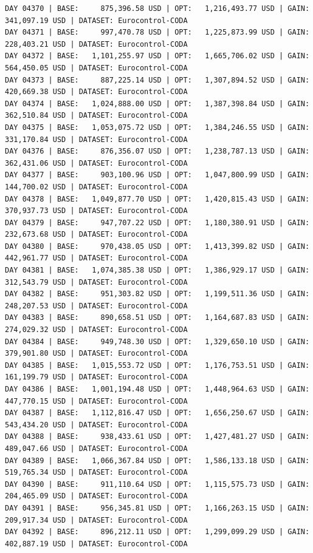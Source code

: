 \documentclass[11pt,a4paper]{article}
\begin{document}
\begin{verbatim}
DAY 04370 | BASE:     875,396.58 USD | OPT:   1,216,493.77 USD | GAIN: 341,097.19 USD | DATASET: Eurocontrol-CODA
DAY 04371 | BASE:     997,470.78 USD | OPT:   1,225,873.99 USD | GAIN: 228,403.21 USD | DATASET: Eurocontrol-CODA
DAY 04372 | BASE:   1,101,255.97 USD | OPT:   1,665,706.02 USD | GAIN: 564,450.05 USD | DATASET: Eurocontrol-CODA
DAY 04373 | BASE:     887,225.14 USD | OPT:   1,307,894.52 USD | GAIN: 420,669.38 USD | DATASET: Eurocontrol-CODA
DAY 04374 | BASE:   1,024,888.00 USD | OPT:   1,387,398.84 USD | GAIN: 362,510.84 USD | DATASET: Eurocontrol-CODA
DAY 04375 | BASE:   1,053,075.72 USD | OPT:   1,384,246.55 USD | GAIN: 331,170.84 USD | DATASET: Eurocontrol-CODA
DAY 04376 | BASE:     876,356.07 USD | OPT:   1,238,787.13 USD | GAIN: 362,431.06 USD | DATASET: Eurocontrol-CODA
DAY 04377 | BASE:     903,100.96 USD | OPT:   1,047,800.99 USD | GAIN: 144,700.02 USD | DATASET: Eurocontrol-CODA
DAY 04378 | BASE:   1,049,877.70 USD | OPT:   1,420,815.43 USD | GAIN: 370,937.73 USD | DATASET: Eurocontrol-CODA
DAY 04379 | BASE:     947,707.22 USD | OPT:   1,180,380.91 USD | GAIN: 232,673.68 USD | DATASET: Eurocontrol-CODA
DAY 04380 | BASE:     970,438.05 USD | OPT:   1,413,399.82 USD | GAIN: 442,961.77 USD | DATASET: Eurocontrol-CODA
DAY 04381 | BASE:   1,074,385.38 USD | OPT:   1,386,929.17 USD | GAIN: 312,543.79 USD | DATASET: Eurocontrol-CODA
DAY 04382 | BASE:     951,303.82 USD | OPT:   1,199,511.36 USD | GAIN: 248,207.53 USD | DATASET: Eurocontrol-CODA
DAY 04383 | BASE:     890,658.51 USD | OPT:   1,164,687.83 USD | GAIN: 274,029.32 USD | DATASET: Eurocontrol-CODA
DAY 04384 | BASE:     949,748.30 USD | OPT:   1,329,650.10 USD | GAIN: 379,901.80 USD | DATASET: Eurocontrol-CODA
DAY 04385 | BASE:   1,015,553.72 USD | OPT:   1,176,753.51 USD | GAIN: 161,199.79 USD | DATASET: Eurocontrol-CODA
DAY 04386 | BASE:   1,001,194.48 USD | OPT:   1,448,964.63 USD | GAIN: 447,770.15 USD | DATASET: Eurocontrol-CODA
DAY 04387 | BASE:   1,112,816.47 USD | OPT:   1,656,250.67 USD | GAIN: 543,434.20 USD | DATASET: Eurocontrol-CODA
DAY 04388 | BASE:     938,433.61 USD | OPT:   1,427,481.27 USD | GAIN: 489,047.66 USD | DATASET: Eurocontrol-CODA
DAY 04389 | BASE:   1,066,367.84 USD | OPT:   1,586,133.18 USD | GAIN: 519,765.34 USD | DATASET: Eurocontrol-CODA
DAY 04390 | BASE:     911,110.64 USD | OPT:   1,115,575.73 USD | GAIN: 204,465.09 USD | DATASET: Eurocontrol-CODA
DAY 04391 | BASE:     956,345.81 USD | OPT:   1,166,263.15 USD | GAIN: 209,917.34 USD | DATASET: Eurocontrol-CODA
DAY 04392 | BASE:     896,212.11 USD | OPT:   1,299,099.29 USD | GAIN: 402,887.19 USD | DATASET: Eurocontrol-CODA

\end{verbatim}
\end{document}
